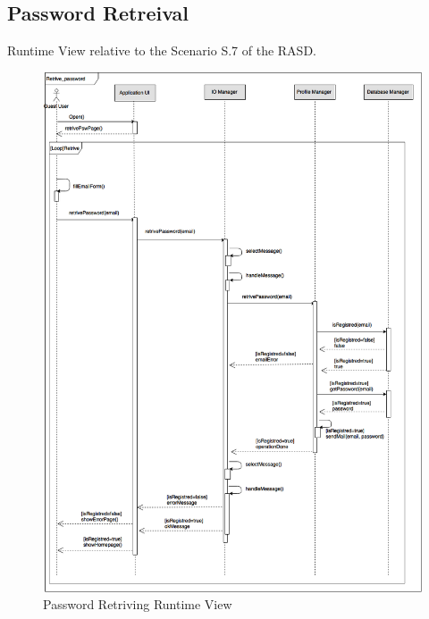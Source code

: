 \documentclass[../../../../../../dd.tex]{subfiles}
\begin{document}
	\subsection{Password Retreival}
			Runtime View relative to the Scenario S.7 of the RASD.
		\begin{figure}[H]
				\centering
				\includegraphics[width=\textwidth, scale=0.5]{../images/SequenceDiagrams/RetrivePassword.png}
			\caption{Password Retriving Runtime View}\label{fig:PasswordRetrive}
		\end{figure}
\end{document}
